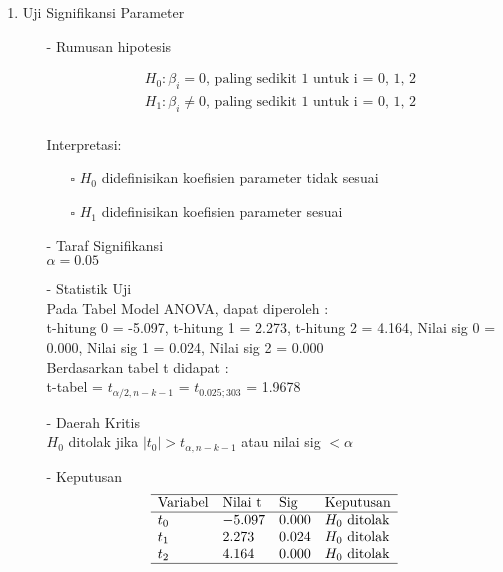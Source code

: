 \begin{enumerate}
\item Uji Signifikansi Parameter \\
\begin{test}{
    \begin{enumerate}
    \item[-] Rumusan hipotesis \\
    \begin{fleqn}[\parindent]
        \begin{equation*}
        \begin{split}
        &H_0 : \beta_i = 0 \text{, paling sedikit 1 untuk i = 0, 1, 2} \\ 
        &H_1 : \beta_i \neq 0 \text{, paling sedikit 1 untuk i = 0, 1, 2}\\
        \end{split}
        \end{equation*}
    \end{fleqn}
    Interpretasi:
    \begin{enumerate}
    \item[$\square$] $H_0$ didefinisikan koefisien parameter tidak sesuai
    \item[$\square$] $H_1$ didefinisikan koefisien parameter sesuai
    \end{enumerate}

    \item[-] Taraf Signifikansi \\
    $\alpha = 0.05$

    \item[-] Statistik Uji \\
    Pada Tabel Model ANOVA, dapat diperoleh : \\
    t-hitung 0 = -5.097, t-hitung 1 = 2.273, t-hitung 2 = 4.164, Nilai sig 0 = 0.000, Nilai sig 1 = 0.024, Nilai sig 2 = 0.000 \\
    Berdasarkan tabel t didapat : \\
    t-tabel = $t_{\alpha/2, n-k-1}$ = $t_{0.025; 303}$ = 1.9678

    \item[-] Daerah Kritis \\
    $H_0$ ditolak jika $|t_0| > t_{\alpha, n-k-1}$ atau nilai sig $< \alpha$

    \item[-] Keputusan \\
    $$\begin{array}{lllll}
        \hline 
        \text{Variabel} & \text{Nilai t} & \text{Sig} & \text{Keputusan}  \\
        \hline 
        t_0 & -5.097 & 0.000 & H_0 \text{ ditolak} \\
        t_1 & 2.273 & 0.024 & H_0 \text{ ditolak} \\
        t_2 & 4.164 & 0.000 & H_0 \text{ ditolak} \\
        \hline
    \end{array}$$


\end{enumerate}}
\end{test}
\end{enumerate}
